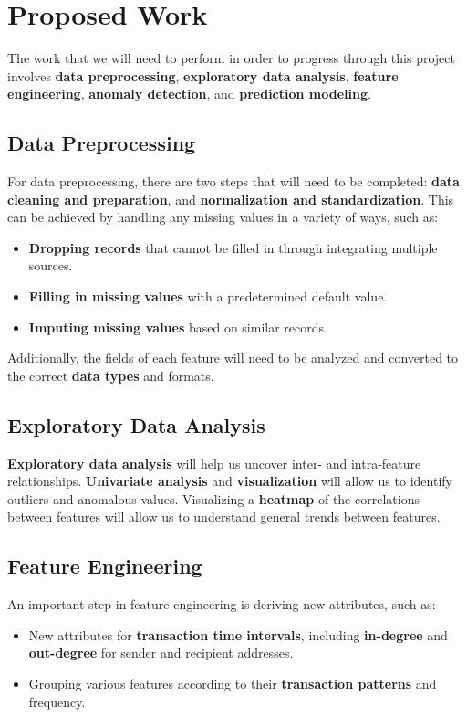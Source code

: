 \documentclass[sigconf]{acmart}
\begin{document}
\section{Proposed Work}

The work that we will need to perform in order to progress through this project involves \textbf{data preprocessing}, \textbf{exploratory data analysis}, \textbf{feature engineering}, \textbf{anomaly detection}, and \textbf{prediction modeling}.

\subsection{Data Preprocessing}

For data preprocessing, there are two steps that will need to be completed: \textbf{data cleaning and preparation}, and \textbf{normalization and standardization}. This can be achieved by handling any missing values in a variety of ways, such as:
\begin{itemize}
    \item \textbf{Dropping records} that cannot be filled in through integrating multiple sources.
    \item \textbf{Filling in missing values} with a predetermined default value.
    \item \textbf{Imputing missing values} based on similar records.
\end{itemize}
Additionally, the fields of each feature will need to be analyzed and converted to the correct \textbf{data types} and formats.

\subsection{Exploratory Data Analysis}

\textbf{Exploratory data analysis} will help us uncover inter- and intra-feature relationships. \textbf{Univariate analysis} and \textbf{visualization} will allow us to identify outliers and anomalous values. Visualizing a \textbf{heatmap} of the correlations between features will allow us to understand general trends between features.

\subsection{Feature Engineering}

An important step in feature engineering is deriving new attributes, such as:
\begin{itemize}
    \item New attributes for \textbf{transaction time intervals}, including \textbf{in-degree} and \textbf{out-degree} for sender and recipient addresses.
    \item Grouping various features according to their \textbf{transaction patterns} and frequency.
\end{itemize}
\end{document}
